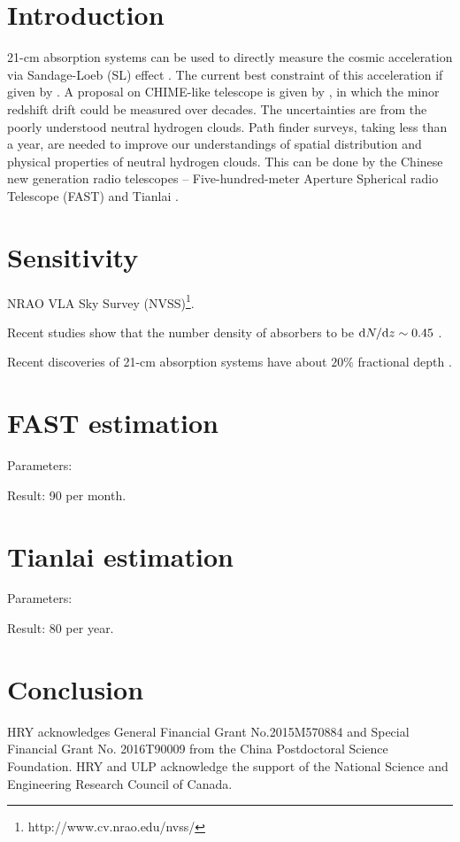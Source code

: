 \documentclass[]{raa}
\newcommand{\diff}{{\rm d}}
\begin{document}
\section{Introduction}
21-cm absorption systems can be used to directly measure the cosmic acceleration
via Sandage-Loeb (SL) effect \citep{1962ApJ...136..319S,1998ApJ...499L.111L}.
The current best constraint of this acceleration if given by 
\cite{2012ApJ...761L..26D}. A proposal
on CHIME-like telescope is given by \cite{2014PhRvL.113d1303Y},
in which the minor redshift drift could be measured over decades.
The uncertainties are from the poorly understood neutral hydrogen
clouds. Path finder surveys, taking less than a year, are needed
to improve our understandings of spatial distribution and physical
properties of neutral hydrogen clouds.
This can be done by the Chinese new generation radio telescopes --
Five-hundred-meter Aperture Spherical radio Telescope (FAST)
\citep{2016RaSc...51.1060L} and
Tianlai \citep{2012IJMPS..12..256C}.


\section{Sensitivity}

NRAO VLA Sky Survey (NVSS)\footnote{http://www.cv.nrao.edu/nvss/}.

Recent studies show that the number density of absorbers to be $\diff N/\diff z\sim 0.45$
\citep{2005ARA&A..43..861W,2007ASSP....3..501Z}.

Recent discoveries of 21-cm absorption systems have about $20\%$ fractional depth
\citep{2015MNRAS.453.1249A,2015MNRAS.453.1268Z}.

\section{FAST estimation}

Parameters:

Result: 90 per month.

\section{Tianlai estimation}

Parameters:

Result: 80 per year.

\section{Conclusion}

\begin{acknowledgements}
HRY acknowledges General Financial Grant No.2015M570884 and
Special Financial Grant No. 2016T90009 from the China
Postdoctoral Science Foundation.
HRY and ULP acknowledge the support of the
National Science and Engineering Research Council of Canada.
\end{acknowledgements}



\end{document}
